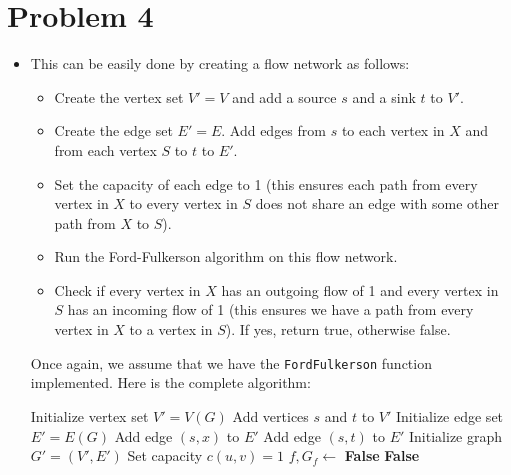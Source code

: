 \documentclass{article}
\begin{document}
\section{Problem 4}
  \begin{itemize}
    \item[(a)] This can be easily done by creating a flow network as follows:
    \begin{itemize}
      \item Create the vertex set $V' = V$ and add a source $s$ and a sink $t$ to $V'$.
      \item Create the edge set $E' = E$.
      Add edges from $s$ to each vertex in $X$ and from each vertex $S$ to $t$ to $E'$.
      \item Set the capacity of each edge to 1 (this ensures each path from every vertex in $X$ to every vertex in $S$ does not share an edge with some other path from $X$ to $S$).
      \item Run the Ford-Fulkerson algorithm on this flow network.
      \item Check if every vertex in $X$ has an outgoing flow of 1 and every vertex in $S$ has an incoming flow of 1 (this ensures we have a path from every vertex in $X$ to a vertex in $S$).
      If yes, return true, otherwise false.
    \end{itemize}
    Once again, we assume that we have the \texttt{FordFulkerson} function implemented.
    Here is the complete algorithm:
    \begin{algorithm}[H]
      \caption{Escape Problem}
      \begin{algorithmic}[1]
          \State Initialize vertex set $V' = V(G)$ 
          \State Add vertices $s$ and $t$ to $V'$
          \State Initialize edge set $E' = E(G)$ 
            \State Add edge $(s, x)$ to $E'$
          \EndFor
            \State Add edge $(s, t)$ to $E'$
          \EndFor
          \State Initialize graph $G' = (V', E')$
            \State Set capacity $c(u, v) = 1$
          \EndFor
          \State $f, G_f \gets$ 
              \State \Return \textbf{False}
            \EndIf
              \State \Return \textbf{False}
            \EndIf

\end{algorithmic}
\end{algorithm}
\end{itemize}
\end{document}

